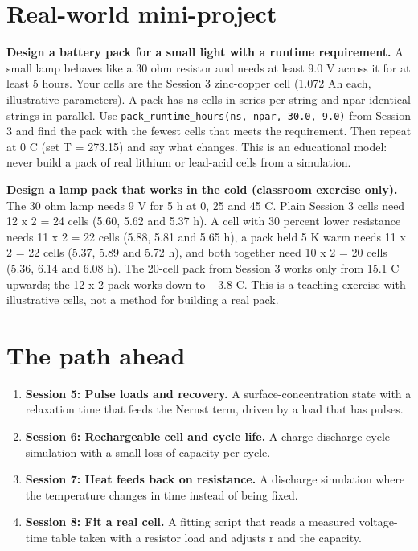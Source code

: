 \documentclass[11pt,a4paper]{article}
\begin{document}
\section{Real-world mini-project}
\textbf{Design a battery pack for a small light with a runtime requirement.} A small lamp behaves like a 30 ohm resistor and needs at least 9.0 V across it for at least 5 hours. Your cells are the Session 3 zinc-copper cell (1.072 Ah each, illustrative parameters). A pack has ns cells in series per string and npar identical strings in parallel. Use \texttt{pack\_runtime\_hours(ns, npar, 30.0, 9.0)} from Session 3 and find the pack with the fewest cells that meets the requirement. Then repeat at 0 C (set T = 273.15) and say what changes. This is an educational model: never build a pack of real lithium or lead-acid cells from a simulation.

\textbf{Design a lamp pack that works in the cold (classroom exercise only).} The 30 ohm lamp needs 9 V for 5 h at 0, 25 and 45 C. Plain Session 3 cells need 12 x 2 = 24 cells (5.60, 5.62 and 5.37 h). A cell with 30 percent lower resistance needs 11 x 2 = 22 cells (5.88, 5.81 and 5.65 h), a pack held 5 K warm needs 11 x 2 = 22 cells (5.37, 5.89 and 5.72 h), and both together need 10 x 2 = 20 cells (5.36, 6.14 and 6.08 h). The 20-cell pack from Session 3 works only from 15.1 C upwards; the 12 x 2 pack works down to $-3.8$ C. This is a teaching exercise with illustrative cells, not a method for building a real pack.

\section{The path ahead}
\begin{enumerate}[nosep]
\item \textbf{Session 5: Pulse loads and recovery.} A surface-concentration state with a relaxation time that feeds the Nernst term, driven by a load that has pulses.
\item \textbf{Session 6: Rechargeable cell and cycle life.} A charge-discharge cycle simulation with a small loss of capacity per cycle.
\item \textbf{Session 7: Heat feeds back on resistance.} A discharge simulation where the temperature changes in time instead of being fixed.
\item \textbf{Session 8: Fit a real cell.} A fitting script that reads a measured voltage-time table taken with a resistor load and adjusts r and the capacity.
\end{enumerate}
\end{document}
